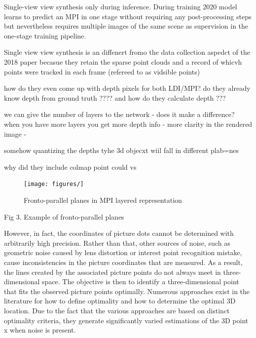 Single-view view synthesis only during inference. During training 2020 model learns to predict an MPI in one stage without requiring any post-processing steps but nevertheless requires multiple images of the same scene as supervision in the one-stage training pipeline.

Single view view synthesis is an diffenert fromo the data collection aspedct of the 2018 paper becasue they retain the sparse point clouds and a record of whicvh points were tracked in each frame (refereed to as vidsible points)


how do they even come up with depth pixels for both LDI/MPI? do they already know depth from ground truth ????
and how do they calculate depth ???

we can give the number of layers to the network - does it make a difference? 
when you have more layers you get more depth info - more clarity in the rendered image -


somehow quantizing the depths 
tyhe 3d objecxt wiil fall in different plab=nes

why did they include colmap point could vs 


\begin{figure}[!h]
    \texttt{[image: figures/]}
    \caption{Fronto-parallel planes in MPI layered representation}
    \label{fig:mpi-layered-representation}
\end{figure}
Fig 3. Example of fronto-parallel planes

However, in fact, the coordinates of picture dots cannot be determined with arbitrarily high precision. Rather than that, other sources of noise, such as geometric noise caused by lens distortion or interest point recognition mistake, cause inconsistencies in the picture coordinates that are measured. As a result, the lines created by the associated picture points do not always meet in three-dimensional space. The objective is then to identify a three-dimensional point that fits the observed picture points optimally. Numerous approaches exist in the literature for how to define optimality and how to determine the optimal 3D location. Due to the fact that the various approaches are based on distinct optimality criteria, they generate significantly varied estimations of the 3D point x when noise is present.